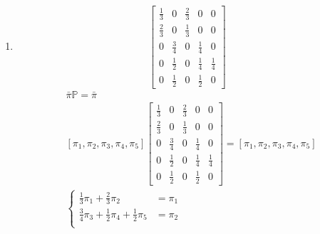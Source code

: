 \documentclass[a4paper,12pt]{article}
\theoremstyle{definition}%
\theoremstyle{definition}
\theoremstyle{problem}
\begin{document}
\begin{enumerate}[label=\alph*)]
\begin{align*}
\begin{matrix}
\frac{1}{3} \pi _2 + \frac{1}{3} \pi _4 &= \pi _3\\
\pi _4 &= \frac{3}{2}\pi _1
\end{matrix}\right. \Leftrightarrow \left\{\begin{matrix}
\pi _1  &= \pi _3\\
\pi _2 & = \frac{3}{2}\pi _1\\
\frac{1}{3} \pi _2 + \frac{1}{3} \pi _4 &= \pi _3\\
\pi _4 &= \frac{3}{2}\pi _1
\end{matrix}\right.\Leftrightarrow \left\{\begin{matrix}
\pi _1  &= \pi _3\\
\pi _2 & = \frac{3}{2}\pi _1\\
\pi _3 &= \pi _1\\
\pi _4 &= \frac{3}{2}\pi _1
\end{matrix}\right.\\
& x + \frac{3}{2}x+x+\frac{3}{2}x = 1\Leftrightarrow 5x = 1\Leftrightarrow x = \frac{1}{5} = 0.2
\end{align*}
Rozkład stacjonarny ma postać: $\left[\frac{1}{5}, \frac{3}{10}, \frac{1}{5}, \frac{3}{10}\right]$
\item 
$$\begin{bmatrix}
\frac{1}{3}&0&\frac{2}{3}&0&0\\
\frac{2}{3}&0&\frac{1}{3}&0&0\\
0&\frac{3}{4}&0&\frac{1}{4}&0\\
0&\frac{1}{2}&0&\frac{1}{4}&\frac{1}{4}\\
0&\frac{1}{2}&0&\frac{1}{2}&0
\end{bmatrix}$$
\begin{align*}
&\bar{\pi}\mathbb{P}=\bar{\pi}\\
&\left[\pi _1, \pi _2,\pi _3,\pi _4,\pi _5\right]\begin{bmatrix}
\frac{1}{3}&0&\frac{2}{3}&0&0\\
\frac{2}{3}&0&\frac{1}{3}&0&0\\
0&\frac{3}{4}&0&\frac{1}{4}&0\\
0&\frac{1}{2}&0&\frac{1}{4}&\frac{1}{4}\\
0&\frac{1}{2}&0&\frac{1}{2}&0
\end{bmatrix}=\left[\pi _1, \pi _2,\pi _3,\pi _4,\pi _5\right]\\
&\left\{\begin{matrix}
\frac{1}{3}\pi _1+\frac{2}{3}\pi _2 &= \pi _1\\
\frac{3}{4}\pi _3 + \frac{1}{2}\pi _4+\frac{1}{2}\pi _5 &= \pi _2\\

\end{matrix}
\end{align*}
\end{enumerate}
\end{document}
